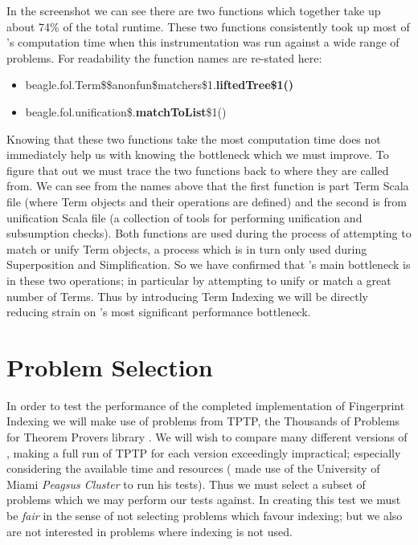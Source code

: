 In the screenshot we can see there are two functions which together take up about
74\% of the total runtime. These two functions consistently took up most of \beagle's
computation time when this instrumentation was run against a wide range of problems.
For readability the function names are re-stated here:
\begin{itemize}
\item[]beagle.fol.Term\$\$anonfun\$matchers\$1.\textbf{liftedTree\$1()}
\item[]beagle.fol.unification\$.\textbf{matchToList}\$1()
\end{itemize}
Knowing that these two functions take the most computation time does not immediately
help us with knowing the bottleneck which we must improve. To figure that out we must
trace the two functions back to where they are called from. We can see from the
names above that the first function is part Term Scala file (where Term objects and their
operations are defined) and the second is from unification Scala file (a collection
of tools for performing unification and subsumption checks). Both functions are
used during the process of attempting to match or unify Term objects, a process
which is in turn only used during Superposition and Simplification. So we have confirmed
that \beagle's main bottleneck is in these two operations; in particular by attempting
to unify or match a great number of Terms. Thus by introducing Term Indexing we will
be directly reducing strain on \beagle's most significant performance bottleneck.

\section{Problem Selection}
\label{sec:problems}

In order to test the performance of the completed implementation of Fingerprint Indexing
we will make use of problems from TPTP, the Thousands of Problems for Theorem Provers
library \cite{tptp}.
We will wish to compare many different versions of \beagle, making a full run of TPTP
for each version
exceedingly impractical; especially considering the available time and resources (
made use of the University of Miami \emph{Peagsus Cluster} to run his tests). Thus
we must select a subset of problems which we may perform our tests against.
In creating this test we must be \emph{fair} in the sense of not selecting
problems which favour indexing; but we also are not interested in problems where
indexing is not used.

